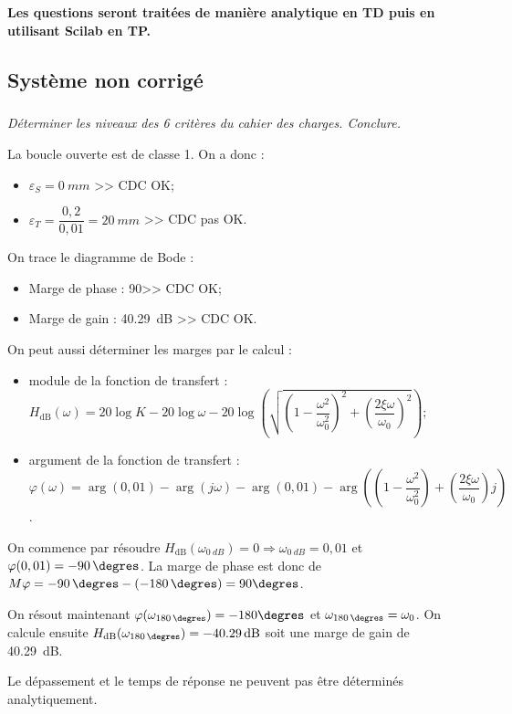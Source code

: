 \documentclass[10pt,fleqn]{article} %
\begin{document}
\begin{multicols}{2}
\textbf{Les questions seront traitées de manière analytique en TD puis en utilisant Scilab en TP.}

\subsection*{Système non corrigé}

\subparagraph{}
\textit{Déterminer les niveaux des 6 critères du cahier des charges. Conclure.}
\ifprof
\begin{corrige}
La boucle ouverte est de classe 1. On a donc : 
\begin{itemize}
\item $\varepsilon_S=\SI{0}{mm}$ >> CDC OK;
\item $\varepsilon_T=\dfrac{0,2}{0,01}=\SI{20}{mm}$ >> CDC pas OK.
\end{itemize}
On trace le diagramme de Bode :
\begin{itemize}
\item Marge de phase : 90\degres >> CDC OK;
\item Marge de gain : \SI{40,29}{dB} >> CDC OK.
\end{itemize}

On peut aussi déterminer les marges par le calcul :
\begin{itemize}
\item module de la fonction de transfert : 
$H_{\text{dB}}(\omega)=20\log K - 20 \log \omega - 20 \log \left( \sqrt{ \left(1-\dfrac{\omega^2}{\omega_0^2} \right)^2+\left(\dfrac{2\xi\omega}{\omega_0} \right)^2}\right)$;
\item argument de la fonction de transfert : 
$\varphi(\omega)=\arg\left(0,01\right)-\arg\left(j\omega\right)-\arg\left(0,01\right)-\arg \left( \left(1-\dfrac{\omega^2}{\omega_0^2} \right)+\left(\dfrac{2\xi\omega}{\omega_0} \right)j\right)$.
\end{itemize}


On commence par résoudre $H_{\text{dB}}(\omega_{\SI{0}{dB}})=0 \Rightarrow \omega_{\SI{0}{dB}}=0,01$ et $\varphi(0,01)=-\SI{90}{\degres}$. La marge de phase est donc de $M\varphi=-\SI{90}{\degres}-\left(-\SI{180}{\degres}\right)=90\degres$.

On résout maintenant $\varphi(\omega_{\SI{180}{\degres}})=-180\degres$ et $\omega_{\SI{180}{\degres}}=\omega_0$. On calcule ensuite $H_{\text{dB}}(\omega_{\SI{180}{\degres}})=-\SI{40,29}{dB}$ soit une marge de gain de \SI{40,29}{dB}.


Le dépassement et le temps de réponse ne peuvent pas être déterminés analytiquement. 



\end{corrige}
\end{multicols}
\end{document}
